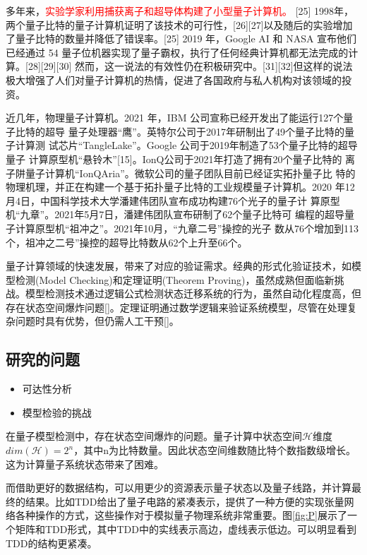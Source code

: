 多年来，\textcolor{red}{实验学家利用捕获离子和超导体构建了小型量子计算机。} [25] 1998年，两个量子比特的量子计算机证明了该技术的可行性，[26][27]以及随后的实验增加了量子比特的数量并降低了错误率。[25] 2019 年，Google AI 和 NASA 宣布他们已经通过 54 量子位机器实现了量子霸权，执行了任何经典计算机都无法完成的计算。[28][29][30] 然而，这一说法的有效性仍在积极研究中。[31][32]但这样的说法极大增强了人们对量子计算机的热情，促进了各国政府与私人机构对该领域的投资。

近几年，物理量子计算机。2021 年，IBM 公司宣称已经开发出了能运行127个量子比特的超导
量子处理器“鹰”。英特尔公司于2017年研制出了49个量子比特的量子计算测
试芯片“TangleLake”。Google 公司于2019年制造了53个量子比特的超导量子
计算原型机“悬铃木”[15]。IonQ公司于2021年打造了拥有20个量子比特的
离子阱量子计算机“IonQAria”。微软公司的量子团队目前已经证实拓扑量子比
特的物理机理，并正在构建一个基于拓扑量子比特的工业规模量子计算机。2020
年12月4日，中国科学技术大学潘建伟团队宣布成功构建76个光子的量子计
算原型机“九章”。2021年5月7日，潘建伟团队宣布研制了62个量子比特可
编程的超导量子计算原型机“祖冲之”。2021年10月，“九章二号”操控的光子
数从76个增加到113个，祖冲之二号”操控的超导比特数从62个上升至66个。

量子计算领域的快速发展，带来了对应的验证需求。经典的形式化验证技术，如模型检测(Model Checking)和定理证明(Theorem Proving)，虽然成熟但面临新挑战。模型检测技术通过逻辑公式检测状态迁移系统的行为，虽然自动化程度高，但存在状态空间爆炸问题[]。定理证明通过数学逻辑来验证系统模型，尽管在处理复杂问题时具有优势，但仍需人工干预[]。
\subsection{研究的问题}
\begin{itemize}
  \item 可达性分析
  \item 模型检验的挑战
\end{itemize}

在量子模型检测中，存在状态空间爆炸的问题。量子计算中状态空间\(\mathcal{H}\)维度\(dim\left(\mathcal{H}\right)=2^n\)，其中n为比特数量。因此状态空间维数随比特个数指数级增长。这为计算量子系统状态带来了困难。

而借助更好的数据结构，可以用更少的资源表示量子状态以及量子线路，并计算最终的结果。比如TDD给出了量子电路的紧凑表示，提供了一种方便的实现张量网络各种操作的方式，这些操作对于模拟量子物理系统非常重要。图\ref{fig:P}展示了一个矩阵和TDD形式，其中TDD中的实线表示高边，虚线表示低边。可以明显看到TDD的结构更紧凑。
 	 
